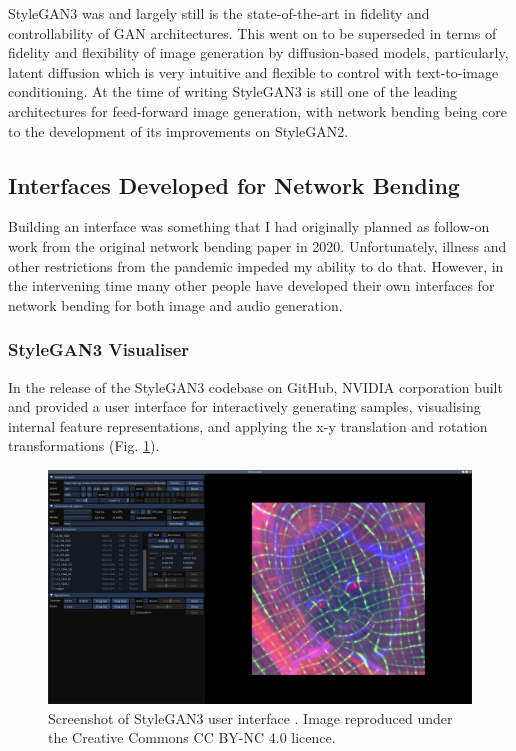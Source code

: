 StyleGAN3 was and largely still is the state-of-the-art in fidelity and controllability of GAN architectures. 
This went on to be superseded in terms of fidelity and flexibility of image generation by diffusion-based models, particularly, latent diffusion \citep{rombach2022high} which is very intuitive and flexible to control with text-to-image conditioning.
At the time of writing StyleGAN3 is still one of the leading architectures for feed-forward image generation, with network bending being core to the development of its improvements on StyleGAN2. 

\subsection{Interfaces Developed for Network Bending}
\label{c7:subsec:net-bend-interfaces}

Building an interface was something that I had originally planned as follow-on work from the original network bending paper in 2020. 
Unfortunately, illness and other restrictions from the pandemic impeded my ability to do that. 
However, in the intervening time many other people have developed their own interfaces for network bending for both image and audio generation.

\subsubsection{StyleGAN3 Visualiser}

In the release of the StyleGAN3 codebase on GitHub, NVIDIA corporation built and provided a user interface for interactively generating samples, visualising internal feature representations, and applying the x-y translation and rotation transformations  (Fig. \ref{fig:c7:stylegan3-interface}).  

\begin{figure}[!htb]
    \centering
    \captionsetup{justification=centering}
    \includegraphics[width=1\textwidth]{figures/c7_impact/net-bend-technical/stylegan3-vis-interface.png}
    \caption[StyleGAN3 user interface]{Screenshot of StyleGAN3 user interface \citep{karras2021alias}. Image reproduced under the Creative Commons CC BY-NC 4.0 licence.}
    \label{fig:c7:stylegan3-interface}
\end{figure}


